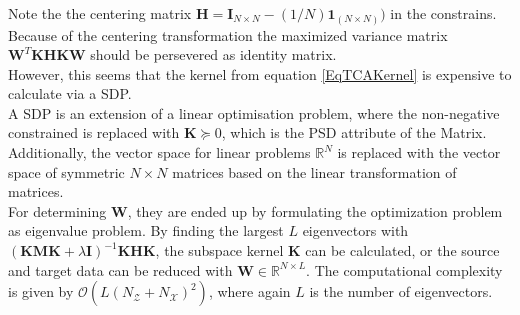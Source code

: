 Note the the centering matrix $\mathbf{H} = \mathbf{I}_{N\times N} - (1/N)\mathbf{1}_{(N\times N)})$ in the constrains. Because of the centering transformation the maximized variance matrix $\mathbf{W}^T\mathbf{KHKW}$ should be persevered as identity matrix.\\
However, this seems that the kernel from equation \eqref{EqTCAKernel} is expensive to calculate via a \ac{SDP}.\cite{Pan.2011}\\
A \acs{SDP} is an extension of a linear optimisation problem, where the non-negative constrained is replaced with $\mathbf{K}\succeq 0$, which is the \acs{PSD} attribute of the Matrix. Additionally, the vector space for linear problems $\mathbb{R}^N$ is replaced with the vector space of symmetric $N\times N$ matrices based on the linear transformation of matrices.\cite{Gartner.2012}\\
For determining $\mathbf{W}$, they are ended up by formulating the optimization problem as eigenvalue problem.
By finding the largest $L$ eigenvectors with $(\mathbf{KMK}+\lambda \mathbf{I})^{-1} \mathbf{KHK}$, the subspace kernel $\mathbf{K}$ can be calculated, or the source and target data can be reduced with $\mathbf{W} \in \mathbb{R}^{N\times L}$.
The computational complexity is given by $\mathcal{O}(L(N_\mathcal{Z}+N_\mathcal{X})^2)$, where again $L$ is the number of eigenvectors.\cite{Pan.2011}
